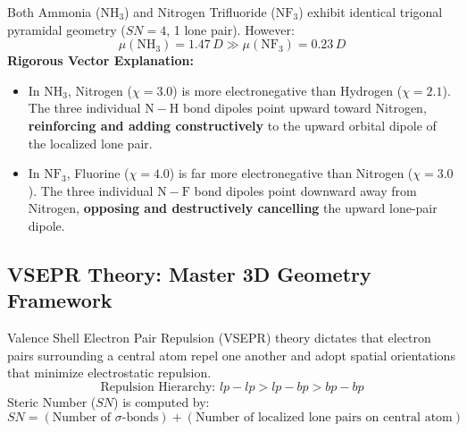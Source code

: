 \documentclass[10pt,a4paper]{article}
\begin{document}
\begin{trapbox}
Both Ammonia ($\mathrm{NH_3}$) and Nitrogen Trifluoride ($\mathrm{NF_3}$) exhibit identical trigonal pyramidal geometry ($SN = 4$, 1 lone pair). However:
\begin{equation}
  \mu(\mathrm{NH_3}) = 1.47\,\si{D} \gg \mu(\mathrm{NF_3}) = 0.23\,\si{D}
\end{equation}
\textbf{Rigorous Vector Explanation:}
\begin{itemize}
  \item In $\mathrm{NH_3}$, Nitrogen ($\chi = 3.0$) is more electronegative than Hydrogen ($\chi = 2.1$). The three individual $\mathrm{N-H}$ bond dipoles point upward toward Nitrogen, \textbf{reinforcing and adding constructively} to the upward orbital dipole of the localized lone pair.
  \item In $\mathrm{NF_3}$, Fluorine ($\chi = 4.0$) is far more electronegative than Nitrogen ($\chi = 3.0$). The three individual $\mathrm{N-F}$ bond dipoles point downward away from Nitrogen, \textbf{opposing and destructively cancelling} the upward lone-pair dipole.
\end{itemize}
\end{trapbox}

\subsection{VSEPR Theory: Master 3D Geometry Framework}
Valence Shell Electron Pair Repulsion (VSEPR) theory dictates that electron pairs surrounding a central atom repel one another and adopt spatial orientations that minimize electrostatic repulsion.
\begin{equation}
  \text{Repulsion Hierarchy: } lp-lp > lp-bp > bp-bp
\end{equation}
Steric Number ($SN$) is computed by:
\begin{equation}
  SN = (\text{Number of }\sigma\text{-bonds}) + (\text{Number of localized lone pairs on central atom})
\end{equation}
\end{document}
